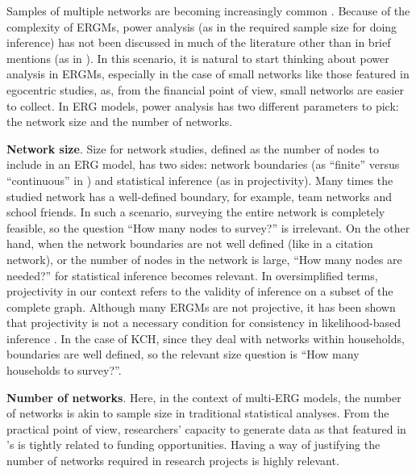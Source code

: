 \documentclass[12pt]{article}
\begin{document}
Samples of multiple networks are becoming increasingly common \citep{yonExponentialRandomGraph2021,krivitskyTaleTwoDatasets2022, duxburyScalingBiasPooled2023}. Because of the complexity of ERGMs, power analysis (as in the required sample size for doing inference) has not been discussed in much of the literature other than in brief mentions (as in \cite{yonExponentialRandomGraph2021}). In this scenario, it is natural to start thinking about power analysis in ERGMs, especially in the case of small networks like those featured in egocentric studies, as, from the financial point of view, small networks are easier to collect. In ERG models, power analysis has two different parameters to pick: the network size and the number of networks. 

\bigskip

\noindent \textbf{Network size}. Size for network studies, defined as the number of nodes to include in an ERG model, has two sides: network boundaries (as ``finite'' versus ``continuous'' in \cite{buttsRevisitingFoundationsNetwork2009}) and statistical inference (as in projectivity). Many times the studied network has a well-defined boundary, for example, team networks and school friends. In such a scenario, surveying the entire network is completely feasible, so the question ``How many nodes to survey?'' is irrelevant. On the other hand, when the network boundaries are not well defined (like in a citation network), or the number of nodes in the network is large, ``How many nodes are needed?'' for statistical inference becomes relevant. In oversimplified terms, projectivity in our context refers to the validity of inference on a subset of the complete graph. Although many ERGMs are not projective, it has been shown that projectivity is not a necessary condition for consistency in likelihood-based inference \citep{schweinbergerNoteRoleProjectivity2017, schweinbergerExponentialFamilyModelsRandom2020}. In the case of KCH, since they deal with networks within households, boundaries are well defined, so the relevant size question is ``How many households to survey?''.
 
\bigskip

\noindent\textbf{Number of networks}. Here, in the context of multi-ERG models, the number of networks is akin to sample size in traditional statistical analyses. From the practical point of view, researchers' capacity to generate data as that featured in \citeauthor*{krivitskyTaleTwoDatasets2022}'s is tightly related to funding opportunities. Having a way of justifying the number of networks required in research projects is highly relevant.
\end{document}
